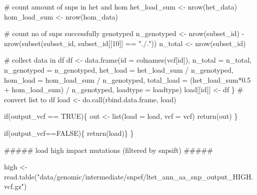 \documentclass[
  letterpaper,
  DIV=11,
  numbers=noendperiod]{scrreprt}
\newenvironment{Shaded}{}{}
\newcommand{\AttributeTok}[1]{\textcolor[rgb]{0.84,0.23,0.29}{#1}}
\newcommand{\CommentTok}[1]{\textcolor[rgb]{0.42,0.45,0.49}{#1}}
\newcommand{\ConstantTok}[1]{\textcolor[rgb]{0.00,0.36,0.77}{#1}}
\newcommand{\ControlFlowTok}[1]{\textcolor[rgb]{0.84,0.23,0.29}{#1}}
\newcommand{\DecValTok}[1]{\textcolor[rgb]{0.00,0.36,0.77}{#1}}
\newcommand{\DocumentationTok}[1]{\textcolor[rgb]{0.42,0.45,0.49}{#1}}
\newcommand{\FloatTok}[1]{\textcolor[rgb]{0.00,0.36,0.77}{#1}}
\newcommand{\FunctionTok}[1]{\textcolor[rgb]{0.44,0.26,0.76}{#1}}
\newcommand{\NormalTok}[1]{\textcolor[rgb]{0.14,0.16,0.18}{#1}}
\newcommand{\OtherTok}[1]{\textcolor[rgb]{0.44,0.26,0.76}{#1}}
\newcommand{\SpecialCharTok}[1]{\textcolor[rgb]{0.00,0.36,0.77}{#1}}
\newcommand{\StringTok}[1]{\textcolor[rgb]{0.01,0.18,0.38}{#1}}
\begin{document}
\begin{Shaded}
\begin{Highlighting}[]
    \CommentTok{\# count amount of snps in het and hom}
\NormalTok{    het\_load\_sum }\OtherTok{\textless{}{-}} \FunctionTok{nrow}\NormalTok{(het\_data)}
\NormalTok{    hom\_load\_sum }\OtherTok{\textless{}{-}} \FunctionTok{nrow}\NormalTok{(hom\_data)}
    
    \CommentTok{\# count no of snps successfully genotyped}
\NormalTok{    n\_genotyped }\OtherTok{\textless{}{-}} \FunctionTok{nrow}\NormalTok{(subset\_id) }\SpecialCharTok{{-}} \FunctionTok{nrow}\NormalTok{(}\FunctionTok{subset}\NormalTok{(subset\_id, subset\_id[[}\DecValTok{10}\NormalTok{]] }\SpecialCharTok{==} \StringTok{"./."}\NormalTok{))}
\NormalTok{    n\_total }\OtherTok{\textless{}{-}} \FunctionTok{nrow}\NormalTok{(subset\_id)}
    
    \CommentTok{\# collect data in df}
\NormalTok{    df }\OtherTok{\textless{}{-}} \FunctionTok{data.frame}\NormalTok{(}\AttributeTok{id =} \FunctionTok{colnames}\NormalTok{(vcf[id]),}
                     \AttributeTok{n\_total =}\NormalTok{ n\_total,}
                     \AttributeTok{n\_genotyped =}\NormalTok{ n\_genotyped,}
                     \AttributeTok{het\_load =}\NormalTok{ het\_load\_sum }\SpecialCharTok{/}\NormalTok{ n\_genotyped,}
                     \AttributeTok{hom\_load =}\NormalTok{ hom\_load\_sum }\SpecialCharTok{/}\NormalTok{ n\_genotyped,}
                     \AttributeTok{total\_load =}\NormalTok{ (het\_load\_sum}\SpecialCharTok{*}\FloatTok{0.5} \SpecialCharTok{+}\NormalTok{ hom\_load\_sum) }\SpecialCharTok{/}\NormalTok{ n\_genotyped,}
                     \AttributeTok{loadtype =}\NormalTok{ loadtype)}
\NormalTok{    load[[id]] }\OtherTok{\textless{}{-}}\NormalTok{ df}
\NormalTok{  \}}
  \CommentTok{\# convert list to df}
\NormalTok{  load }\OtherTok{\textless{}{-}} \FunctionTok{do.call}\NormalTok{(rbind.data.frame, load)}
  
  \ControlFlowTok{if}\NormalTok{(output\_vcf }\SpecialCharTok{==} \ConstantTok{TRUE}\NormalTok{)\{}
\NormalTok{    out }\OtherTok{\textless{}{-}} \FunctionTok{list}\NormalTok{(}\AttributeTok{load =}\NormalTok{ load, }\AttributeTok{vcf =}\NormalTok{ vcf)}
    \FunctionTok{return}\NormalTok{(out)}
\NormalTok{  \}}
  
  \ControlFlowTok{if}\NormalTok{(output\_vcf}\SpecialCharTok{==}\ConstantTok{FALSE}\NormalTok{)\{}
    \FunctionTok{return}\NormalTok{(load)\}}
\NormalTok{\}}

\DocumentationTok{\#\#\#\#\# load high impact mutations (filtered by snpsift) \#\#\#\#\#}

\NormalTok{high }\OtherTok{\textless{}{-}} \FunctionTok{read.table}\NormalTok{(}\StringTok{"data/genomic/intermediate/snpef/ltet\_ann\_aa\_snp\_output\_HIGH.vcf.gz"}\NormalTok{)}


\end{Highlighting}
\end{Shaded}
\end{document}
